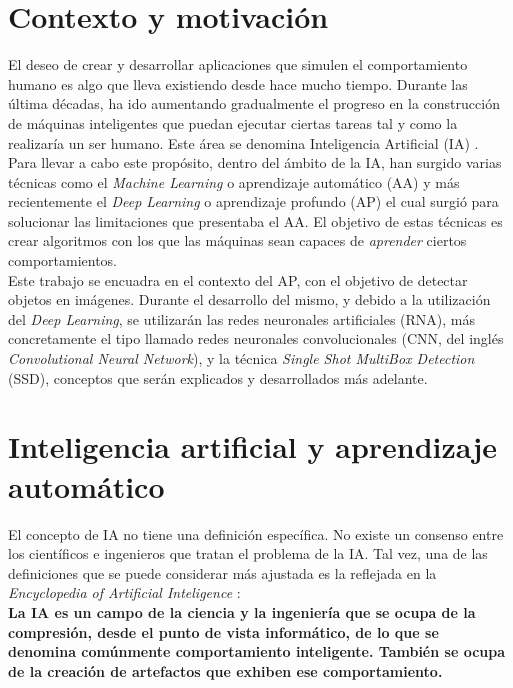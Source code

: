 \documentclass[a4paper, 12pt, oneside]{book}
\begin{document}
\section{Contexto y motivación}

El deseo de crear y desarrollar aplicaciones que simulen el comportamiento humano es algo que lleva existiendo desde hace mucho tiempo. Durante las última décadas, ha ido aumentando gradualmente el progreso en la construcción de máquinas inteligentes que puedan ejecutar ciertas tareas tal y como la realizaría un ser humano. Este área se denomina Inteligencia Artificial (IA) \cite{IA_Introduccion}.\\

Para llevar a cabo este propósito, dentro del ámbito de la IA, han surgido varias técnicas como el \textit{Machine Learning} o aprendizaje automático (AA) y más recientemente el \textit{Deep Learning} o aprendizaje profundo (AP) el cual surgió para solucionar las limitaciones que presentaba el AA. El objetivo de estas técnicas es crear algoritmos con los que las máquinas sean capaces de \textit{aprender} ciertos comportamientos.\\

Este trabajo se encuadra en el contexto del AP, con el objetivo de detectar objetos en imágenes. Durante el desarrollo del mismo, y debido a la utilización del \textit{Deep Learning}, se utilizarán las redes neuronales artificiales (RNA), más concretamente el tipo llamado redes neuronales convolucionales (CNN, del inglés \textit{Convolutional Neural Network}), y la técnica \textit{Single Shot MultiBox Detection} (SSD), conceptos que serán explicados y desarrollados más adelante.

\section{Inteligencia artificial y aprendizaje automático}

El concepto de IA no tiene una definición específica. No existe un consenso entre los científicos e ingenieros que tratan el problema de la IA. Tal vez, una de las definiciones que se puede considerar más ajustada es la reflejada en la \textit{Encyclopedia of Artificial Inteligence} \cite{IA_Encyclopedia}:\\

\textbf{La IA es un campo de la ciencia y la ingeniería que se ocupa de la compresión, desde el punto de vista informático, de lo que se denomina comúnmente comportamiento inteligente. También se ocupa de la creación de artefactos que exhiben ese comportamiento.}\\
\end{document}
